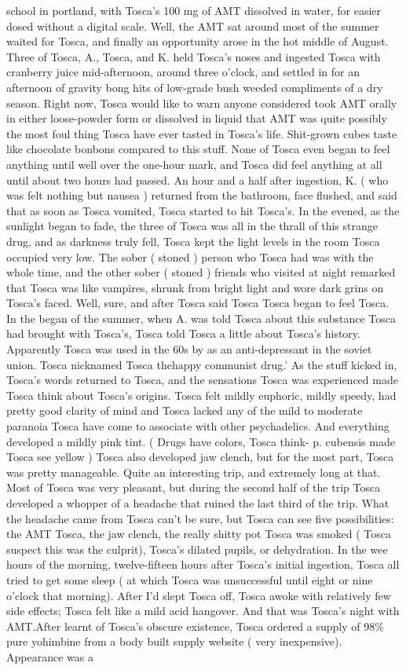 \documentclass[12pt]{book}
\begin{document}
school in portland,  with Tosca's 100 mg of AMT dissolved in water, for easier dosed without a digital scale. Well, the AMT sat around most of the summer waited for Tosca, and finally an opportunity arose in the hot middle of August. Three of Tosca, A., Tosca, and K. held Tosca's noses and ingested Tosca with cranberry juice mid-afternoon, around three o'clock, and settled in for an afternoon of gravity bong hits of low-grade bush weeded compliments of a dry season. Right now, Tosca would like to warn anyone considered took AMT orally in either loose-powder form or dissolved in liquid that AMT was quite possibly the most foul thing Tosca have ever tasted in Tosca's life. Shit-grown cubes taste like chocolate bonbons compared to this stuff. None of Tosca even began to feel anything until well over the one-hour mark, and Tosca did feel anything at all until about two hours had passed. An hour and a half after ingestion, K. ( who was felt nothing but nausea ) returned from the bathroom, face flushed, and said that as soon as Tosca vomited, Tosca started to hit Tosca's. In the evened, as the sunlight began to fade, the three of Tosca was all in the thrall of this strange drug, and as darkness truly fell, Tosca kept the light levels in the room Tosca occupied very low. The sober ( stoned ) person who Tosca had was with the whole time, and the other sober ( stoned ) friends who visited at night remarked that Tosca was like vampires, shrunk from bright light and wore dark grins on Tosca's faced. Well, sure, and after Tosca said Tosca Tosca began to feel Tosca. In the began of the summer, when A. was told Tosca about this substance Tosca had brought with Tosca's, Tosca told Tosca a little about Tosca's history. Apparently Tosca was used in the 60s by as an anti-depressant in the soviet union. Tosca nicknamed Tosca thehappy communist drug.' As the stuff kicked in, Tosca's words returned to Tosca, and the sensations Tosca was experienced made Tosca think about Tosca's origins. Tosca felt mildly euphoric, mildly speedy, had pretty good clarity of mind and Tosca lacked any of the mild to moderate paranoia Tosca have come to associate with other psychadelics. And everything developed a mildly pink tint. ( Drugs have colors, Tosca think- p. cubensis made Tosca see yellow ) Tosca also developed jaw clench, but for the most part, Tosca was pretty manageable. Quite an interesting trip, and extremely long at that. Most of Tosca was very pleasant, but during the second half of the trip Tosca developed a whopper of a headache that ruined the last third of the trip. What the headache came from Tosca can't be sure, but Tosca can see five possibilities: the AMT Tosca, the jaw clench, the really shitty pot Tosca was smoked ( Tosca suspect this was the culprit), Tosca's dilated pupils, or dehydration. In the wee hours of the morning, twelve-fifteen hours after Tosca's initial ingestion, Tosca all tried to get some sleep ( at which Tosca was unsuccessful until eight or nine o'clock that morning). After I'd slept Tosca off, Tosca awoke with relatively few side effects; Tosca felt like a mild acid hangover. And that was Tosca's night with AMT.After learnt of Tosca's obscure existence, Tosca ordered a supply of 98\% pure yohimbine from a body built supply website ( very inexpensive). Appearance was a 
\end{document}
